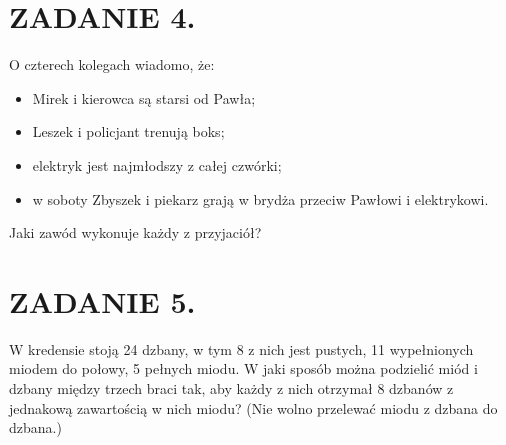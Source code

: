 \documentclass[10pt]{article}
\begin{document}
\section*{ZADANIE 4.}
O czterech kolegach wiadomo, że:

\begin{itemize}
  \item Mirek i kierowca są starsi od Pawła;
  \item Leszek i policjant trenują boks;
  \item elektryk jest najmłodszy z całej czwórki;
  \item w soboty Zbyszek i piekarz grają w brydża przeciw Pawłowi i elektrykowi.
\end{itemize}

Jaki zawód wykonuje każdy z przyjaciół?

\section*{ZADANIE 5.}
W kredensie stoją 24 dzbany, w tym 8 z nich jest pustych, 11 wypełnionych miodem do połowy, 5 pełnych miodu. W jaki sposób można podzielić miód i dzbany między trzech braci tak, aby każdy z nich otrzymał 8 dzbanów z jednakową zawartością w nich miodu? (Nie wolno przelewać miodu z dzbana do dzbana.)
\end{document}
